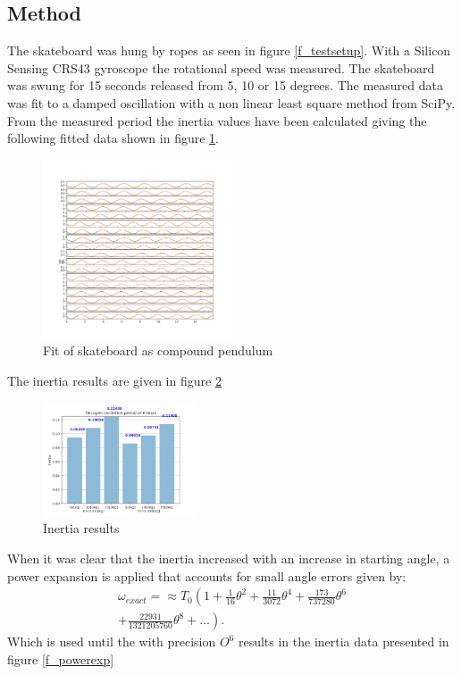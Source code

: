 \subsection*{Method}
The skateboard was hung by ropes as seen in figure \ref{f_testsetup}. With a Silicon Sensing CRS43 gyroscope the rotational speed was measured. The skateboard was swung for 15 seconds released from 5, 10 or 15 degrees. The measured data was fit to a damped oscillation with a non linear least square method from SciPy. From the measured period the inertia values have been calculated giving the following fitted data shown in figure \ref{f_dampedoscillation}.
\begin{figure}
    \centering
    \includegraphics[width = 0.5\textwidth]{figure/damped_oscilation_fitdpi600.png}
    \caption{Fit of skateboard as compound pendulum}
    \label{f_dampedoscillation}
\end{figure}
The inertia results are given in figure \ref{f_inertianopower}
\begin{figure}
    \centering
    \includegraphics[width = 0.4\textwidth]{figure/Inertia_result_nopowerexpansiondpi600.png}
    \caption{Inertia results}
    \label{f_inertianopower}
\end{figure}
When it was clear that the inertia increased with an increase in starting angle, a power expansion is applied that accounts for small angle errors given by:
\begin{equation}
\begin{array}{r}
\omega_{exact} =  \approx T_0\left(1+\frac{1}{16} \theta^2+\frac{11}{3072} \theta^4+\frac{173}{737280} \theta^6\right. \\
\left.+\frac{22931}{1321205760} \theta^8+\ldots\right) .
\end{array}
\end{equation}
Which is used until the with precision $O^6$ results in the inertia data presented in figure \ref{f_powerexp}

